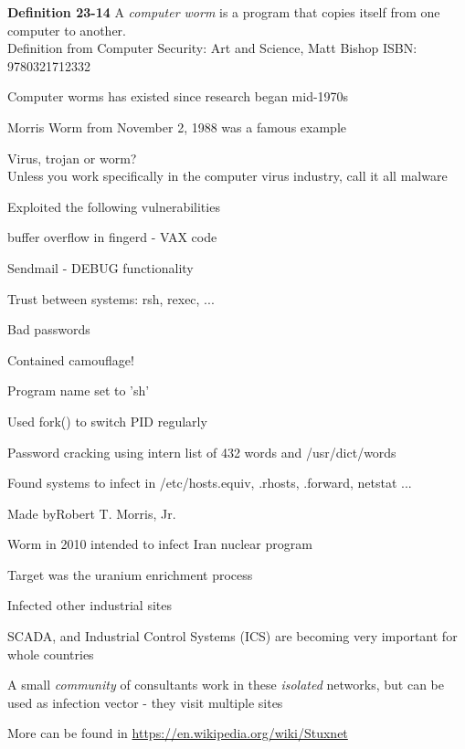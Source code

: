 \documentclass[Screen16to9,17pt]{foils}
\begin{document}
\begin{list1}
\item {\bf Definition 23-14} A \emph{computer worm} is a program that copies itself from one computer to another.\\
Definition from Computer Security: Art and Science, Matt Bishop ISBN: 9780321712332
\item Computer worms has existed since research began mid-1970s
\item Morris Worm from November 2, 1988 was a famous example
\vskip 2cm
\item Virus, trojan or worm?\\
Unless you work specifically in the computer virus industry, call it all malware

\end{list1}



\begin{list1}
\item Exploited the following vulnerabilities
\begin{list2}
\item buffer overflow in fingerd - VAX code
\item Sendmail - DEBUG functionality
\item Trust between systems: rsh, rexec, ...
\item Bad passwords
\end{list2}
\item Contained camouflage!
\begin{list2}
\item Program name set to 'sh'
\item Used fork() to switch PID regularly
\item Password cracking using intern list of 432 words and /usr/dict/words
\item Found systems to infect in /etc/hosts.equiv, .rhosts, .forward, netstat ...
\end{list2}
\item Made byRobert T. Morris, Jr.
\end{list1}



\begin{list1}
\item Worm in 2010 intended to infect Iran nuclear program
\item Target was the uranium enrichment process
\item Infected other industrial sites
\item SCADA, and Industrial Control Systems (ICS) are becoming very important for whole countries
\item A small \emph{community} of consultants work in these \emph{isolated} networks, but can be used as infection vector - they visit multiple sites
\item More can be found in \url{https://en.wikipedia.org/wiki/Stuxnet}
\end{list1}
\end{document}
